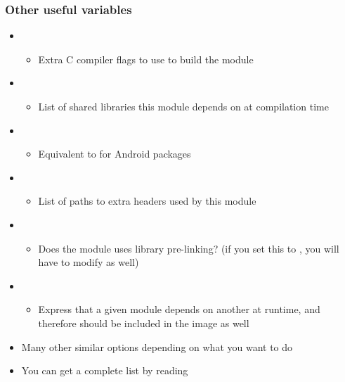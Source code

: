 \begin{frame}
  \frametitle{Other useful variables}
  \begin{itemize}
  \item {}
    \begin{itemize}
    \item Extra C compiler flags to use to build the module
    \end{itemize}
  \item {}
    \begin{itemize}
    \item List of shared libraries this module depends on at
      compilation time
    \end{itemize}
  \item {}
    \begin{itemize}
    \item Equivalent to  for Android packages
    \end{itemize}
  \item {}
    \begin{itemize}
    \item List of paths to extra headers used by this module
    \end{itemize}
  \item {}
    \begin{itemize}
    \item Does the module uses library pre-linking? (if you set this
      to , you will have to modify
       as well)
    \end{itemize}
  \item {}
    \begin{itemize}
    \item Express that a given module depends on another at runtime,
      and therefore should be included in the image as well
    \end{itemize}
  \item Many other similar options depending on what you want to
    do
  \item You can get a complete list by reading
  \end{itemize}
\end{frame}

